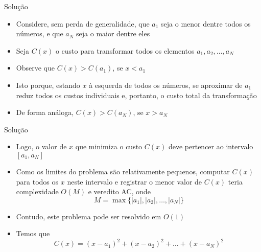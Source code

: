 \begin{frame}[fragile]{Solução}

    \begin{itemize}
        \item Considere, sem perda de generalidade, que $a_1$ seja o menor dentre todos os números,
            e que $a_N$ seja o maior dentre eles

        \item Seja $C(x)$ o custo para transformar todos os elementos $a_1, a_2, \ldots, a_N$

        \item Observe que $C(x) > C(a_1)$, se $x < a_1$

        \item Isto porque, estando $x$ à esquerda de todos os números, se aproximar de $a_1$ 
            reduz todos os custos individuais e, portanto, o custo total da transformação
        
        \item De forma análoga, $C(x) > C(a_N)$, se $x > a_N$

    \end{itemize}

\end{frame}


\begin{frame}[fragile]{Solução}

    \begin{itemize}
        \item Logo, o valor de $x$ que minimiza o custo $C(x)$ deve pertencer ao intervalo
            $[a_1, a_N]$

        \item Como os limites do problema são relativamente pequenos, computar $C(x)$ para todos
            os $x$ neste intervalo e registrar o menor valor de $C(x)$ teria complexidade $O(M)$ e
            veredito AC, onde 
            \[
                M = \max\{ |a_1|, |a_2|, \ldots, |a_N| \}
            \]

        \item Contudo, este problema pode ser resolvido em $O(1)$

        \item Temos que
        \[
            C(x) = (x - a_1)^2 + (x - a_2)^2 + \ldots + (x - a_N)^2
        \]
    \end{itemize}

\end{frame}



